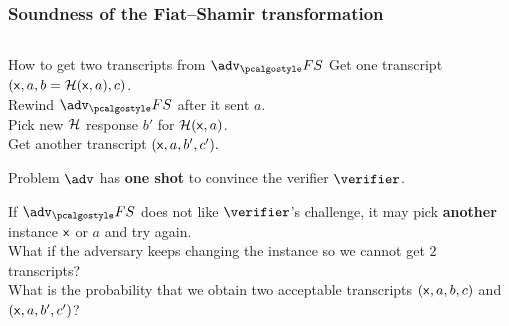 \documentclass[aspectratio=169,handout]{beamer}
\renewcommand{\emph}[1]{\textbf{#1}}
\newcommand{\advfs}{\adv_\fs}
\renewcommand{\myskip}{0.5\baselineskip}
\begin{document}
\begin{frame}
  \frametitle{Soundness of the Fiat--Shamir transformation}
  \begin{columns}
    \begin{column}{0.5\linewidth}
  \begin{block}{How to get two transcripts from $\advfs$}
    Get one transcript $(\mathsf{x}, a, b = \mathcal{H}(\mathsf{x}, a), c)$.\\
    Rewind $\advfs$ after it sent $a$.\\
    Pick new $\mathcal{H}$ response $b'$ for $\mathcal{H}(\mathsf{x}, a)$.\\
    Get another transcript $(\mathsf{x}, a, b', c').$
  \end{block}
  
  \begin{block}{Problem}
    $\adv$ has \emph{one shot} to convince the verifier $\verifier$.

    If $\advfs$ does not like $\verifier$'s challenge, it may pick \emph{another}
    instance $\mathsf{x}$ or $a$ and try again.\\[\myskip]
    What if the adversary keeps changing the instance so we cannot get $2$
    transcripts?\\[\myskip]
    What is the probability that we obtain two acceptable transcripts $(\mathsf{x}, a,
    b, c)$ and $(\mathsf{x}, a, b', c')$?
  \end{block}



\end{column}
\end{columns}
\end{frame}
\end{document}
